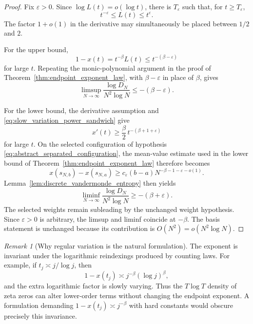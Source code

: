 \documentclass[preprint,12pt]{elsarticle}
\numberwithin{equation}{section}
\theoremstyle{plain}
\theoremstyle{definition}
\theoremstyle{remark}
\newtheorem{remark}[theorem]{Remark}
\begin{document}
\begin{proof}
Fix \(\varepsilon>0\).  Since \(\log L(t)=o(\log t)\), there is
\(T_\varepsilon\) such that, for \(t\ge T_\varepsilon\),
\begin{equation}
t^{-\varepsilon}\le L(t)\le t^\varepsilon.
\label{eq:slow_variation_power_sandwich}
\end{equation}
The factor \(1+o(1)\) in the derivative may simultaneously be placed between
\(1/2\) and \(2\).

For the upper bound,
\[
1-x(t)=t^{-\beta}L(t)\le t^{-(\beta-\varepsilon)}
\]
for large \(t\).  Repeating the monic-polynomial argument in the proof of
Theorem~\ref{thm:endpoint_exponent_law}, with \(\beta-\varepsilon\) in place of
\(\beta\), gives
\[
\limsup_{N\to\infty}
\frac{\log D_N}{N^2\log N}
\le-(\beta-\varepsilon).
\]

For the lower bound, the derivative assumption and
\eqref{eq:slow_variation_power_sandwich} give
\[
x'(t)\ge \frac{\beta}{2}\,t^{-(\beta+1+\varepsilon)}
\]
for large \(t\).  On the selected configuration of hypothesis
\eqref{eq:abstract_separated_configuration}, the mean-value estimate used in the lower
bound of Theorem~\ref{thm:endpoint_exponent_law} therefore becomes
\[
x(s_{N,b})-x(s_{N,a})
\ge c_\varepsilon(b-a)
N^{-\beta-1-\varepsilon-o(1)}.
\]
Lemma~\ref{lem:discrete_vandermonde_entropy} then yields
\[
\liminf_{N\to\infty}
\frac{\log D_N}{N^2\log N}
\ge-(\beta+\varepsilon).
\]
The selected weights remain subleading by the unchanged weight hypothesis.  Since
\(\varepsilon>0\) is arbitrary, the limsup and liminf coincide at \(-\beta\).
The basis statement is unchanged because its contribution is
\(O(N^2)=o(N^2\log N)\).
\end{proof}

\begin{remark}[Why regular variation is the natural formulation]
\label{rem:endpoint_regular_variation_natural}
The exponent is invariant under the logarithmic reindexings produced by counting laws.  For
example, if \(t_j\asymp j/\log j\), then
\[
1-x(t_j)\asymp j^{-\beta}(\log j)^\beta,
\]
and the extra logarithmic factor is slowly varying.  Thus the \(T\log T\) density of zeta zeros can
alter lower-order terms without changing the endpoint exponent.  A formulation demanding
\(1-x(t_j)\asymp j^{-\beta}\) with hard constants would obscure precisely this invariance.
\end{remark}
\end{document}
